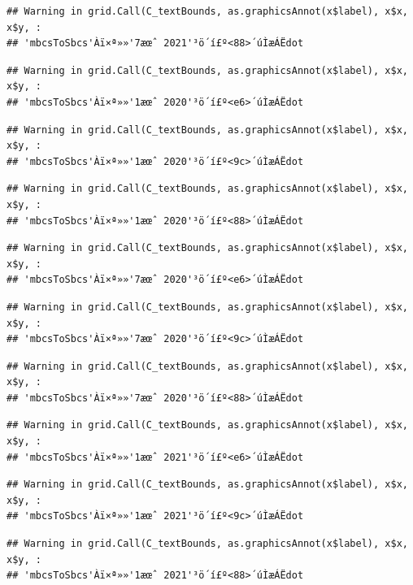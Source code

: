 \documentclass[
]{book}
\begin{document}
\begin{verbatim}
## Warning in grid.Call(C_textBounds, as.graphicsAnnot(x$label), x$x, x$y, :
## 'mbcsToSbcs'Àï×ª»»'7æœˆ 2021'³ö´í£º<88>´úÌæÁËdot
\end{verbatim}

\begin{verbatim}
## Warning in grid.Call(C_textBounds, as.graphicsAnnot(x$label), x$x, x$y, :
## 'mbcsToSbcs'Àï×ª»»'1æœˆ 2020'³ö´í£º<e6>´úÌæÁËdot
\end{verbatim}

\begin{verbatim}
## Warning in grid.Call(C_textBounds, as.graphicsAnnot(x$label), x$x, x$y, :
## 'mbcsToSbcs'Àï×ª»»'1æœˆ 2020'³ö´í£º<9c>´úÌæÁËdot
\end{verbatim}

\begin{verbatim}
## Warning in grid.Call(C_textBounds, as.graphicsAnnot(x$label), x$x, x$y, :
## 'mbcsToSbcs'Àï×ª»»'1æœˆ 2020'³ö´í£º<88>´úÌæÁËdot
\end{verbatim}

\begin{verbatim}
## Warning in grid.Call(C_textBounds, as.graphicsAnnot(x$label), x$x, x$y, :
## 'mbcsToSbcs'Àï×ª»»'7æœˆ 2020'³ö´í£º<e6>´úÌæÁËdot
\end{verbatim}

\begin{verbatim}
## Warning in grid.Call(C_textBounds, as.graphicsAnnot(x$label), x$x, x$y, :
## 'mbcsToSbcs'Àï×ª»»'7æœˆ 2020'³ö´í£º<9c>´úÌæÁËdot
\end{verbatim}

\begin{verbatim}
## Warning in grid.Call(C_textBounds, as.graphicsAnnot(x$label), x$x, x$y, :
## 'mbcsToSbcs'Àï×ª»»'7æœˆ 2020'³ö´í£º<88>´úÌæÁËdot
\end{verbatim}

\begin{verbatim}
## Warning in grid.Call(C_textBounds, as.graphicsAnnot(x$label), x$x, x$y, :
## 'mbcsToSbcs'Àï×ª»»'1æœˆ 2021'³ö´í£º<e6>´úÌæÁËdot
\end{verbatim}

\begin{verbatim}
## Warning in grid.Call(C_textBounds, as.graphicsAnnot(x$label), x$x, x$y, :
## 'mbcsToSbcs'Àï×ª»»'1æœˆ 2021'³ö´í£º<9c>´úÌæÁËdot
\end{verbatim}

\begin{verbatim}
## Warning in grid.Call(C_textBounds, as.graphicsAnnot(x$label), x$x, x$y, :
## 'mbcsToSbcs'Àï×ª»»'1æœˆ 2021'³ö´í£º<88>´úÌæÁËdot
\end{verbatim}
\end{document}
